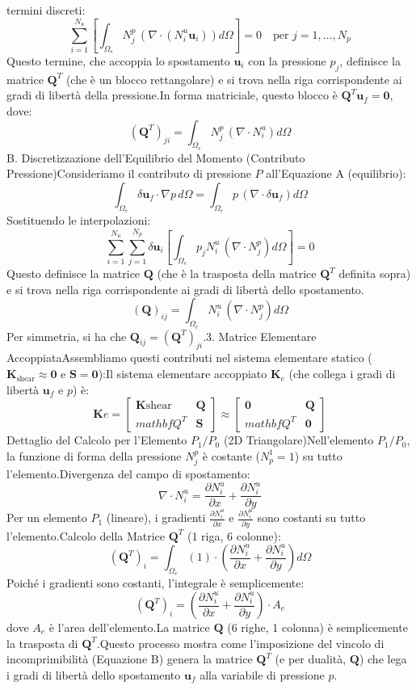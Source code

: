 \documentclass{article}
\begin{document}
termini discreti:$$\sum_{i=1}^{N_u} \left[ \int_{\Omega_e} N_j^p \, (\nabla \cdot (N_i^u \mathbf{u}_i)) d\Omega \right] = 0 \quad \text{per } j = 1, \dots, N_p$$Questo termine, che accoppia lo spostamento $\mathbf{u}_i$ con la pressione $p_j$, definisce la matrice $\mathbf{Q}^T$ (che è un blocco rettangolare) e si trova nella riga corrispondente ai gradi di libertà della pressione.In forma matriciale, questo blocco è $\mathbf{Q}^T \mathbf{u}_f = \mathbf{0}$, dove:$$(\mathbf{Q}^T)_{ji} = \int_{\Omega_e} N_j^p \, (\nabla \cdot N_i^u) d\Omega$$B. Discretizzazione dell'Equilibrio del Momento (Contributo Pressione)Consideriamo il contributo di pressione $P$ all'Equazione A (equilibrio):$$\int_{\Omega_e} \delta \mathbf{u}_f \cdot \nabla p \, d\Omega = \int_{\Omega_e} p \, (\nabla \cdot \delta \mathbf{u}_f) d\Omega$$Sostituendo le interpolazioni:$$\sum_{i=1}^{N_u} \sum_{j=1}^{N_p} \delta \mathbf{u}_i \left[ \int_{\Omega_e} p_j N_i^u \, (\nabla \cdot N_j^p) d\Omega \right] = 0$$Questo definisce la matrice $\mathbf{Q}$ (che è la trasposta della matrice $\mathbf{Q}^T$ definita sopra) e si trova nella riga corrispondente ai gradi di libertà dello spostamento.$$(\mathbf{Q})_{ij} = \int_{\Omega_e} N_i^u \, (\nabla \cdot N_j^p) d\Omega$$Per simmetria, si ha che $\mathbf{Q}_{ij} = (\mathbf{Q}^T)_{ji}$.3. Matrice Elementare AccoppiataAssembliamo questi contributi nel sistema elementare statico ($\mathbf{K}_{\text{shear}} \approx \mathbf{0}$ e $\mathbf{S} = \mathbf{0}$):Il sistema elementare accoppiato $\mathbf{K}_e$ (che collega i gradi di libertà $\mathbf{u}_f$ e $p$) è:$$ \mathbf{K}e = \begin{bmatrix}\mathbf{K}{\text{shear}} & \mathbf{Q} \\mathbf{Q}^T & \mathbf{S}\end{bmatrix} \approx \begin{bmatrix}\mathbf{0} & \mathbf{Q} \\mathbf{Q}^T & \mathbf{0}\end{bmatrix} $$Dettaglio del Calcolo per l'Elemento $P_1/P_0$ (2D Triangolare)Nell'elemento $P_1/P_0$, la funzione di forma della pressione $N_j^p$ è costante ($N_p^1 = 1$) su tutto l'elemento.Divergenza del campo di spostamento:$$\nabla \cdot N_i^u = \frac{\partial N_i^u}{\partial x} + \frac{\partial N_i^u}{\partial y}$$Per un elemento $P_1$ (lineare), i gradienti $\frac{\partial N_i^u}{\partial x}$ e $\frac{\partial N_i^u}{\partial y}$ sono costanti su tutto l'elemento.Calcolo della Matrice $\mathbf{Q}^T$ (1 riga, 6 colonne):$$(\mathbf{Q}^T)_i = \int_{\Omega_e} (1) \cdot \left( \frac{\partial N_i^u}{\partial x} + \frac{\partial N_i^u}{\partial y} \right) d\Omega$$Poiché i gradienti sono costanti, l'integrale è semplicemente:$$(\mathbf{Q}^T)_i = \left( \frac{\partial N_i^u}{\partial x} + \frac{\partial N_i^u}{\partial y} \right) \cdot A_e$$dove $A_e$ è l'area dell'elemento.La matrice $\mathbf{Q}$ (6 righe, 1 colonna) è semplicemente la trasposta di $\mathbf{Q}^T$.Questo processo mostra come l'imposizione del vincolo di incomprimibilità (Equazione B) genera la matrice $\mathbf{Q}^T$ (e per dualità, $\mathbf{Q}$) che lega i gradi di libertà dello spostamento $\mathbf{u}_f$ alla variabile di pressione $p$.
\end{document}
